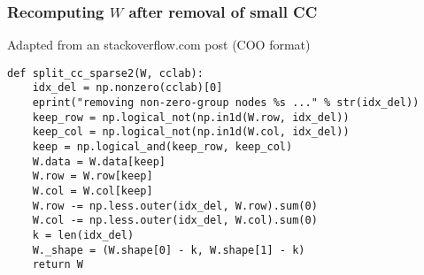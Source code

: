  \begin{frame}
  \frametitle{Recomputing $W$ after removal of small CC}
  \begin{block}{Adapted from an stackoverflow.com post (COO format)}
    \begin{lstlisting}
def split_cc_sparse2(W, cclab):
    idx_del = np.nonzero(cclab)[0]
    eprint("removing non-zero-group nodes %s ..." % str(idx_del))
    keep_row = np.logical_not(np.in1d(W.row, idx_del))
    keep_col = np.logical_not(np.in1d(W.col, idx_del))
    keep = np.logical_and(keep_row, keep_col)
    W.data = W.data[keep]
    W.row = W.row[keep]
    W.col = W.col[keep]
    W.row -= np.less.outer(idx_del, W.row).sum(0)
    W.col -= np.less.outer(idx_del, W.col).sum(0)
    k = len(idx_del)
    W._shape = (W.shape[0] - k, W.shape[1] - k)
    return W
    \end{lstlisting}
  \end{block}
\end{frame}
